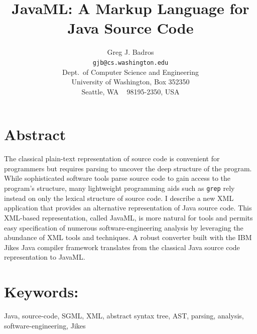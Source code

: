 \documentclass{article}
\begin{document}

\newcommand{\smtexttt}[1]{{\small\texttt{#1}}}
\newenvironment{shellcommand}{\begin{verbatim}}{\end{verbatim}}
\newenvironment{shelloutput}{\begin{verbatim}}{\end{verbatim}}

\title{JavaML: A Markup Language for Java Source Code}
\author{Greg J. Badros \\
\smtexttt{gjb@cs.washington.edu}\\
Dept.\ of Computer Science and Engineering\\
University of Washington, Box 352350\\
Seattle, WA ~ 98195-2350, USA}
\date{}

\thispagestyle{empty}
\pagestyle{empty}

\maketitle

\section*{Abstract}
      The classical plain-text representation of source code is convenient
      for programmers but requires parsing to uncover the deep structure
      of the program.  While sophisticated software tools parse source
      code to gain access to the program's structure, many lightweight
      programming aids such as \smtexttt{grep} rely instead on only the
      lexical structure of source code.  I describe a new XML
      application that provides an alternative representation
      of Java source code. This XML-based representation, called JavaML,
      is more natural for tools and permits easy specification of
      numerous software-engineering analysis by leveraging the abundance
      of XML tools and techniques.  A robust converter built with the IBM
      Jikes Java compiler framework translates from the classical Java
      source code representation to JavaML.

\section*{Keywords:}

Java, source-code, SGML, XML, abstract syntax tree, AST, parsing,
analysis, software-engineering, Jikes
\end{document}
